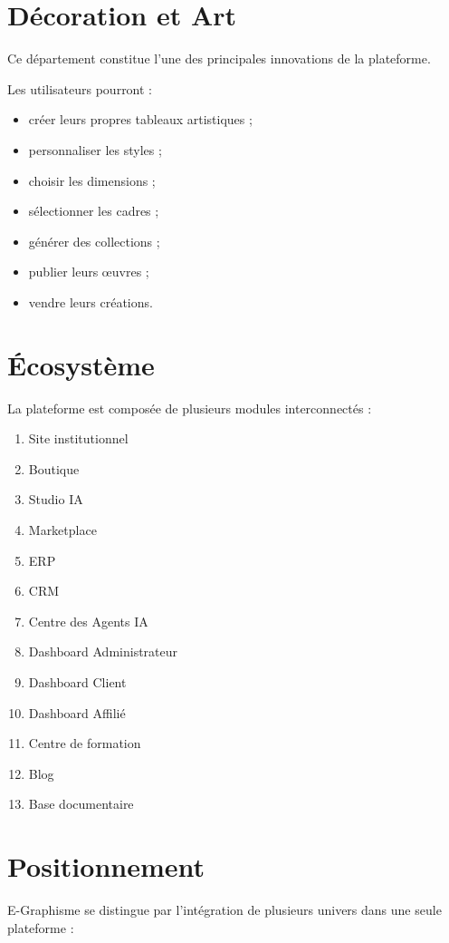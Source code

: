 \documentclass[12pt,a4paper,oneside]{book}
\begin{document}
\chapter{Décoration et Art}

Ce département constitue l'une des principales innovations de la plateforme.

Les utilisateurs pourront :

\begin{itemize}
\item créer leurs propres tableaux artistiques ;
\item personnaliser les styles ;
\item choisir les dimensions ;
\item sélectionner les cadres ;
\item générer des collections ;
\item publier leurs œuvres ;
\item vendre leurs créations.
\end{itemize}

\chapter{Écosystème}

La plateforme est composée de plusieurs modules interconnectés :

\begin{enumerate}
\item Site institutionnel
\item Boutique
\item Studio IA
\item Marketplace
\item ERP
\item CRM
\item Centre des Agents IA
\item Dashboard Administrateur
\item Dashboard Client
\item Dashboard Affilié
\item Centre de formation
\item Blog
\item Base documentaire
\end{enumerate}

\chapter{Positionnement}

E-Graphisme se distingue par l'intégration de plusieurs univers dans une seule plateforme :
\end{document}

